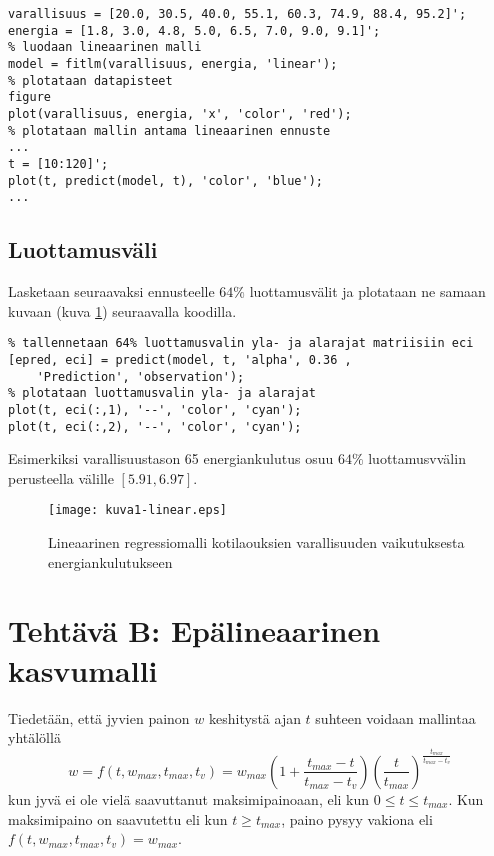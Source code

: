 \documentclass[a4paper,11pt]{article}
\begin{document}
{\begin{lstlisting}
varallisuus = [20.0, 30.5, 40.0, 55.1, 60.3, 74.9, 88.4, 95.2]';
energia = [1.8, 3.0, 4.8, 5.0, 6.5, 7.0, 9.0, 9.1]';
% luodaan lineaarinen malli
model = fitlm(varallisuus, energia, 'linear');
% plotataan datapisteet
figure
plot(varallisuus, energia, 'x', 'color', 'red');
% plotataan mallin antama lineaarinen ennuste
...
t = [10:120]';
plot(t, predict(model, t), 'color', 'blue');
...
\end{lstlisting}

\subsection{Luottamusväli}

Lasketaan seuraavaksi ennusteelle $64\%$ luottamusvälit ja plotataan ne samaan kuvaan (kuva \ref{fig:k1}) seuraavalla koodilla.

\begin{lstlisting}
% tallennetaan 64% luottamusvalin yla- ja alarajat matriisiin eci
[epred, eci] = predict(model, t, 'alpha', 0.36 ,
    'Prediction', 'observation');
% plotataan luottamusvalin yla- ja alarajat
plot(t, eci(:,1), '--', 'color', 'cyan');
plot(t, eci(:,2), '--', 'color', 'cyan');
\end{lstlisting}

Esimerkiksi varallisuustason 65 energiankulutus osuu $64\%$ luottamusvvälin perusteella välille $[5.91, 6.97]$.

\begin{figure}
    \centering
    \texttt{[image: kuva1-linear.eps]}
    \caption{Lineaarinen regressiomalli kotilaouksien varallisuuden vaikutuksesta energiankulutukseen}
    \label{fig:k1}
\end{figure}

\section{Tehtävä B: Epälineaarinen kasvumalli}

Tiedetään, että jyvien painon $w$ keshitystä ajan $t$ suhteen voidaan mallintaa yhtälöllä
\begin{equation}
    w = f(t, w_{max}, t_{max}, t_v) = w_{max}(1+\frac{t_{max}-t}{t_{max}-t_v})(\frac{t}{t_{max}})^{\frac{t_{max}}{t_{max}-t_v}}
\end{equation}
kun jyvä ei ole vielä saavuttanut maksimipainoaan, eli kun $0 \leq t \leq t_{max}$. Kun maksimipaino on saavutettu eli kun $t \geq t_{max}$, paino pysyy vakiona eli $f(t, w_{max}, t_{max}, t_v) = w_{max}$.

}
\end{document}
